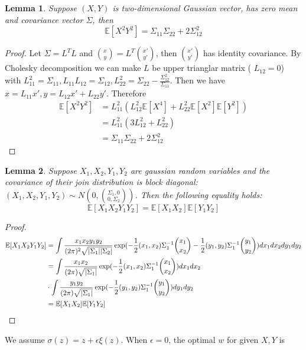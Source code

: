 \documentclass{article}
\DeclarePairedDelimiter\abs{\lvert}{\rvert}
\def\E{\mathbb{E}}
\newtheorem{lemma}{Lemma}
\begin{document}
\begin{lemma}\label{lem:x2y2}
Suppose $(X,Y)$ is two-dimensional Gaussian vector, has zero mean and covariance vector $\Sigma$, then 
\begin{equation}
\E[X^2 Y^2] =\Sigma_{11}\Sigma_{22} + 2\Sigma_{12}^2
\end{equation}
\end{lemma}
\begin{proof}
Let $\Sigma = L^T L $ and $\binom{x}{y} = L^T \binom{x'}{y'}$, then $\binom{x'}{y'}$ has identity covariance. By Cholesky decomposition we can make $L$ be upper trianglar matrix (
$L_{12}=0$) with $L_{11}^2 = \Sigma_{11}, L_{11}L_{12} = \Sigma_{12}, L_{22}^2 = \Sigma_{22} - \frac{\Sigma_{12}^2}{\Sigma_{11}}$. Then we have $x = L_{11} x', y = L_{12} x' + L_{22} y'$. Therefore
\begin{align*}
\E[X^2 Y^2] & = L_{11}^2 (L_{12}^2\E[X^4]+ L^2_{22}\E[X^2]\E[Y^2]) \\
& = L_{11}^2(3L_{12}^2 + L^2_{22}) \\
& = \Sigma_{11}\Sigma_{22} + 2\Sigma_{12}^2
\end{align*}
\end{proof}
\begin{lemma}\label{lem:abcd}
Suppose $X_1, X_2, Y_1, Y_2$ are gaussian random variables and the covariance of their join distribution is block diagonal:
$(X_1, X_2, Y_1, Y_2) \sim N(0, \binom{\Sigma_1, 0}{0, \Sigma_2})$. Then the following equality holds:
\begin{equation}
\E[X_1X_2Y_1Y_2] = \E[X_1 X_2] \E[Y_1 Y_2]
\end{equation}
\end{lemma}
\begin{proof}
\begin{align*}
\E[X_1X_2Y_1Y_2] & = \int \frac{x_1 x_2 y_1 y_2 }{(2\pi)^2 \sqrt{\abs{\Sigma_1}\abs{\Sigma_2}}}\exp(-\frac{1}{2}(x_1, x_2) \Sigma_1^{-1} \binom{x_1}{x_2}-\frac{1}{2}(y_1, y_2) \Sigma_1^{-1} \binom{y_1}{y_2})dx_1 d x_2 dy_1 dy_2 \\
& = \int \frac{x_1 x_2  }{(2\pi) \sqrt{\abs{\Sigma_1}}}\exp(-\frac{1}{2}(x_1, x_2) \Sigma_1^{-1} \binom{x_1}{x_2})dx_1 d x_2  \\
&\cdot  \int \frac{y_1 y_2  }{(2\pi) \sqrt{\abs{\Sigma_1}}}\exp(-\frac{1}{2}(y_1, y_2) \Sigma_1^{-1} \binom{y_1}{y_2})dy_1 d y_2 \\
& = \E[X_1 X_2] \E[Y_1 Y_2]
\end{align*}
\end{proof}
We assume $\sigma(z) = z + \epsilon \xi(z)$. When $\epsilon = 0$, the optimal $w$ for given $X, Y$ is 
\end{document}
